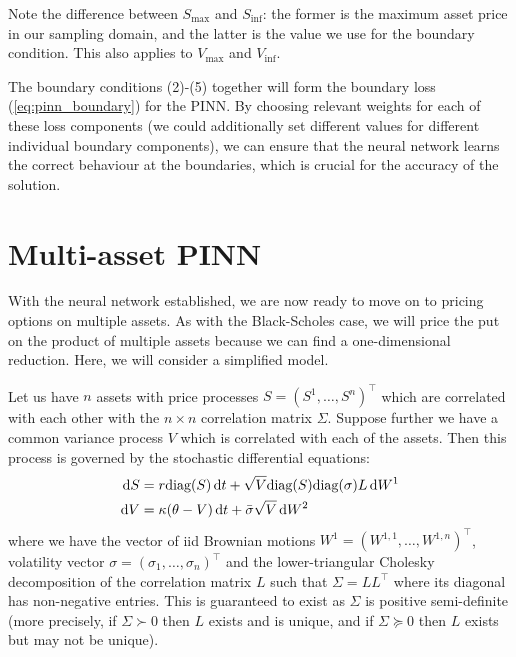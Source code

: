 Note the difference between $S_\text{max}$ and $S_\text{inf}$: the former is the maximum asset price in our sampling domain, and the latter is the value we use for the boundary condition. This also applies to $V_\text{max}$ and $V_\text{inf}$.

The boundary conditions (2)-(5) together will form the boundary loss (\ref{eq:pinn_boundary}) for the PINN. By choosing relevant weights for each of these loss components (we could additionally set different values for different individual boundary components), we can ensure that the neural network learns the correct behaviour at the boundaries, which is crucial for the accuracy of the solution.


\section{Multi-asset PINN}

With the neural network established, we are now ready to move on to pricing options on multiple assets. As with the Black-Scholes case, we will price the put on the product of multiple assets because we can find a one-dimensional reduction. Here, we will consider a simplified model.

Let us have $n$ assets with price processes $S = (S^1, \dots, S^n)^\top$ which are correlated with each other with the $n \times n$ correlation matrix $\Sigma$. Suppose further we have a common variance process $V$ which is correlated with each of the assets. Then this process is governed by the stochastic differential equations:
\begin{align}
    \mathrm d S &= r\text{diag}(S) \,\mathrm d t + \sqrt V \text{diag}(S) \text{diag}(\sigma) L \,\mathrm d W^1 \\
    \mathrm d V &= \kappa(\theta - V)\,\mathrm d t + \bar \sigma \sqrt V \,\mathrm d W^2
\end{align}
where we have the vector of iid Brownian motions $W^1 = (W^{1, 1}, \dots, W^{1, n})^\top$, volatility vector $\sigma = (\sigma_1, \dots, \sigma_n)^\top$ and the lower-triangular Cholesky decomposition of the correlation matrix $L$ such that $\Sigma = LL^\top$ where its diagonal has non-negative entries. This is guaranteed to exist as $\Sigma$ is positive semi-definite (more precisely, if $\Sigma \succ 0$ then $L$ exists and is unique, and if $\Sigma \succeq 0$ then $L$ exists but may not be unique).

